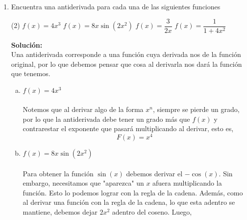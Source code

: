 \documentclass[12pt]{article}
\newenvironment{solucion}
{\begin{mdframed}[backgroundcolor=black!10]
		{\bf Solución:}\\
	}
	{
	\end{mdframed}
}
\newenvironment{preguntas}
{\begin{enumerate}\itemsep12pt
	}
	{
	\end{enumerate}
}
\newcommand{\ra}{\rightarrow}
\begin{document}
\begin{preguntas}
\begin{solucion}
Para la intersección con el eje $X$, hacemos $y = 0$, por lo que
$$1-x_0^2 = -2x_0(x-x_0) \ra x* = \dfrac{1+x_0^2}{2x_0}$$
Donde $x^*$ corresponde a la altura del triangulo\\

Para la intersección con el eje $Y$, hacemos $x = 0$, por lo que
$$y-(1-x_0^2) = 2x_0^2 \ra y* = 1 + x_0^2$$
Donde $y^*$ corresponde a la base del triangulo.\\

Luego, nuestra función área corresponderá a
$$A(x_0) = \dfrac{x^*y^*}{2} = \dfrac{(1+x_0^2)^2}{4x_0}, \ x > 0$$
Derivando,
$$A'(x_0) = \dfrac{(x_0^2)(3x_0^2-1)}{4x_0^2} = 0$$
De donde obtenemos que los puntos críticos son $\dfrac{1}{\sqrt[]{3}}$ y $-\dfrac{1}{\sqrt[]{3}}$. Sin embargo, $x$ debe ser positivo, por lo que el único punto crítico que tenemos es $x = \dfrac{1}{\sqrt[]{3}}$\\
\\
Además, notemos que para $x \in \left(0, \dfrac{1}{\sqrt[]{3}}\right) \ra A'(x) < 0$ y para $x > \dfrac{1}{\sqrt[]{3}} \ra A'(x) > 0$, por lo que $x = \dfrac{1}{\sqrt[]{3}}$ corresponde al área mínima, la cual es
$$A\left(\dfrac{1}{\sqrt[]{3}}\right) = \dfrac{2}{3}$$
\end{solucion}
\item Encuentra una antiderivada para cada una de las siguientes funciones
\begin{tasks}(2)
\task $f(x) = 4x^3$
\task $f(x) = 8x\sin (2x^2)$
\task $f(x) = \dfrac{3}{2x}$
\task $f(x) = \dfrac{1}{1+4x^2}$
\end{tasks}
\begin{solucion}
Una antiderivada corresponde a una función cuya derivada nos de la función original, por lo que debemos pensar que cosa al derivarla nos dará la función que tenemos.
\begin{enumerate}[a)]
\item $f(x) = 4x^3$\\
\\
Notemos que al derivar algo de la forma $x^n$, siempre se pierde un grado, por lo que la antiderivada debe tener un grado más que $f(x)$ y contrarestar el exponente que pasará multiplicando al derivar, esto es,
$$F(x) = x^4$$
\item $f(x) = 8x\sin (2x^2)$\\
\\
Para obtener la función $\sin(x)$ debemos derivar el $-\cos(x)$. Sin embargo, necesitamos que "aparezca" un $x$ afuera multiplicando la función. Esto lo podemos lograr con la regla de la cadena. Además, como al derivar una función con la regla de la cadena, lo que esta adentro se mantiene, debemos dejar $2x^2$ adentro del coseno. Luego,

\end{enumerate}
\end{solucion}
\end{preguntas}
\end{document}
